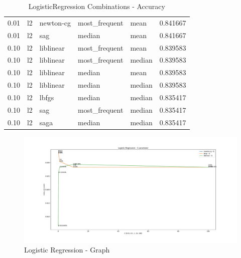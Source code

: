 \documentclass[12pt,twoside]{report}
\begin{document}
\begin{table}[ht!]
\begin{center}
{\begin{tabular}{rllllr}
   0.01 &           l2 &   newton-cg &                   most\_frequent &                            mean &  0.841667 \\
   0.01 &           l2 &         sag &                          median &                            mean &  0.841667 \\
   0.10 &           l2 &   liblinear &                   most\_frequent &                            mean &  0.839583 \\
   0.10 &           l2 &   liblinear &                   most\_frequent &                          median &  0.839583 \\
   0.10 &           l2 &   liblinear &                          median &                            mean &  0.839583 \\
   0.10 &           l2 &   liblinear &                          median &                          median &  0.839583 \\
   0.10 &           l2 &       lbfgs &                          median &                          median &  0.835417 \\
   0.10 &           l2 &         sag &                   most\_frequent &                          median &  0.835417 \\
   0.10 &           l2 &        saga &                          median &                          median &  0.835417 \\
\bottomrule
\end{tabular}
}
\end{center}
\caption{LogisticRegression Combinations - Accuracy}
\label{lr:table}
\end{table}

\begin{figure}[ht!]
\includegraphics[width=\textwidth]{./code/figures_python/parameters/lr_graph.pdf}
\caption{Logistic Regression - Graph}
\label{lr:graph}
\end{figure}
\end{document}
